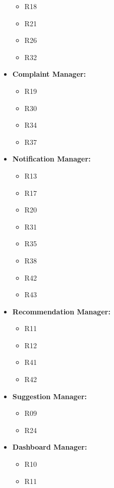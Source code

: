 \begin{itemize}
          \begin{itemize}
              \item R18
              \item R21
              \item R26
              \item R32
          \end{itemize}
    \item \textbf{Complaint Manager:}
          \begin{itemize}
              \item R19
              \item R30
              \item R34
              \item R37
          \end{itemize}
    \item \textbf{Notification Manager:}
          \begin{itemize}
              \item R13
              \item R17
              \item R20
              \item R31
              \item R35
              \item R38
              \item R42
              \item R43
          \end{itemize}
    \item \textbf{Recommendation Manager:}
          \begin{itemize}
              \item R11
              \item R12
              \item R41
              \item R42
          \end{itemize}
    \item \textbf{Suggestion Manager:}
          \begin{itemize}
              \item R09
              \item R24
          \end{itemize}
    \item \textbf{Dashboard Manager:}
          \begin{itemize}
              \item R10
              \item R11

\end{itemize}
\end{itemize}
